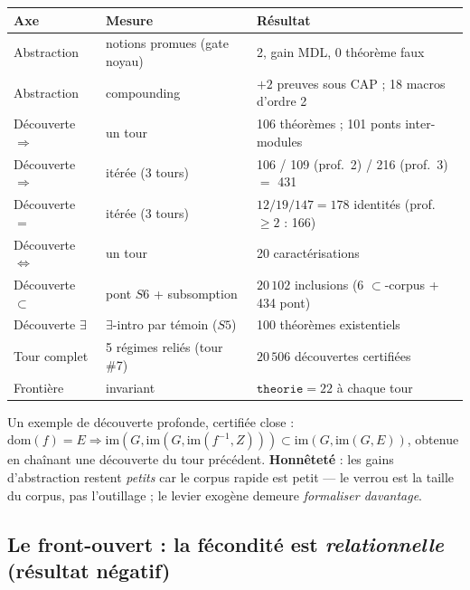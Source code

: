 \begin{center}
\begin{tabular}{@{}lll@{}}
\toprule
Axe & Mesure & Résultat \\
\midrule
Abstraction & notions promues (gate noyau) & 2, gain MDL, 0 théorème faux \\
Abstraction & compounding & $+2$ preuves sous CAP ; 18 macros d'ordre 2 \\
Découverte $\Rightarrow$ & un tour & 106 théorèmes ; 101 ponts inter-modules \\
Découverte $\Rightarrow$ & itérée (3 tours) & 106 / 109 (prof.\ 2) / 216 (prof.\ 3) $=$ 431 \\
Découverte $=$ & itérée (3 tours) & $12/19/147 = 178$ identités (prof.\ $\geq 2$ : 166) \\
Découverte $\Leftrightarrow$ & un tour & 20 caractérisations \\
Découverte $\subset$ & pont $S6$ + subsomption & $20\,102$ inclusions (6 $\subset$-corpus + 434 pont) \\
Découverte $\exists$ & $\exists$-intro par témoin ($S5$) & 100 théorèmes existentiels \\
Tour complet & 5 régimes reliés (tour \#7) & $20\,506$ découvertes certifiées \\
Frontière   & invariant & $\texttt{theorie}=22$ à chaque tour \\
\bottomrule
\end{tabular}
\end{center}

Un exemple de découverte profonde, certifiée close : $\mathrm{dom}(f)=E \Rightarrow
\mathrm{im}(G,\mathrm{im}(G,\mathrm{im}(f^{-1},Z)))\subset\mathrm{im}(G,\mathrm{im}(G,E))$,
obtenue en chaînant une découverte du tour précédent. \textbf{Honnêteté} : les
gains d'abstraction restent \emph{petits} car le corpus rapide est petit --- le
verrou est la taille du corpus, pas l'outillage ; le levier exogène demeure
\emph{formaliser davantage}.

\subsection{Le front-ouvert : la fécondité est \emph{relationnelle} (résultat négatif)}


